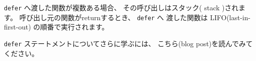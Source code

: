 \texttt{defer} へ渡した関数が複数ある場合、
その呼び出しはスタック( stack )されます。 
呼び出し元の関数がreturnするとき、 \texttt{defer} へ
渡した関数は LIFO(last-in-first-out) の順番で実行されます。

\texttt{defer} ステートメントについてさらに学ぶには、 
こちら(blog post)を読んでみてください。
